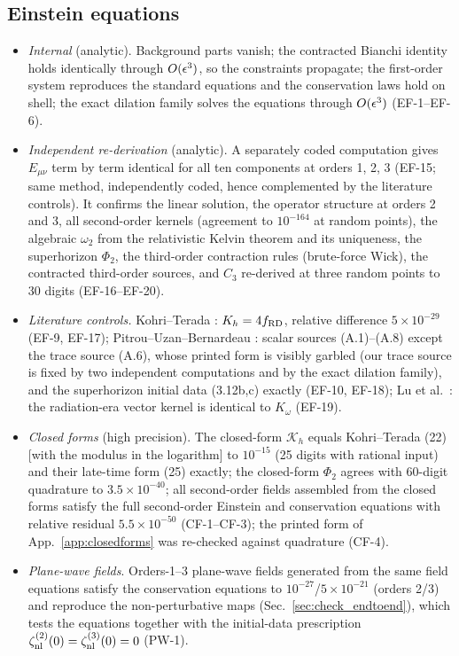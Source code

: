 \subsection{Einstein equations}
\label{sec:check_einstein}
\begin{itemize}\itemsep2pt
\item \emph{Internal} (analytic).  Background parts vanish; the contracted Bianchi identity holds identically through $O(\epsilon^3)$, so the
constraints propagate; the first-order system reproduces the standard equations and the conservation laws hold on shell; the exact dilation
family solves the equations through $O(\epsilon^3)$ (EF-1--EF-6).
\item \emph{Independent re-derivation} (analytic).  A separately coded computation gives $E_{\mu\nu}$ term by term identical for all ten
components at orders 1, 2, 3 (EF-15; same method, independently coded, hence complemented by the literature controls).  It confirms the
linear solution, the operator structure at orders 2 and 3, all second-order kernels (agreement to $10^{-164}$ at random points), the
algebraic $\omega_2$ from the relativistic Kelvin theorem and its uniqueness, the superhorizon $\Phi_2$, the third-order contraction rules
(brute-force Wick), the contracted third-order sources, and $C_3$ re-derived at three random points to 30 digits (EF-16--EF-20).
\item \emph{Literature controls.}  Kohri--Terada \cite{KT}: $K_h=4f_{\rm RD}$, relative difference $5\times10^{-29}$ (EF-9, EF-17); Pitrou--Uzan--Bernardeau
\cite{PUB}: scalar sources (A.1)--(A.8) except the trace source (A.6), whose printed form is visibly garbled (our trace source is fixed by two
independent computations and by the exact dilation family), and the superhorizon initial data (3.12b,c) exactly (EF-10, EF-18); Lu et al.\ \cite{Lu}:
the radiation-era vector kernel is identical to $K_\omega$ (EF-19).
\item \emph{Closed forms} (high precision).  The closed-form $\mathcal K_h$ equals Kohri--Terada (22) [with the modulus in the logarithm] to
$10^{-15}$ (25 digits with rational input) and their late-time form (25) exactly; the closed-form $\Phi_2$ agrees with 60-digit quadrature to
$3.5\times10^{-40}$; all second-order fields assembled from the closed forms satisfy the full second-order Einstein and conservation equations
with relative residual $5.5\times10^{-50}$ (CF-1--CF-3); the printed form of App.~\ref{app:closedforms} was re-checked against quadrature (CF-4).
\item \emph{Plane-wave fields}.  Orders-1--3 plane-wave fields generated from the same field equations satisfy the conservation equations to
$10^{-27}$/$5\times10^{-21}$ (orders 2/3) and reproduce the non-perturbative maps (Sec.~\ref{sec:check_endtoend}), which tests the equations
together with the initial-data prescription $\zeta^{(2)}_{\rm nl}(0)=\zeta^{(3)}_{\rm nl}(0)=0$ (PW-1).
\end{itemize}

